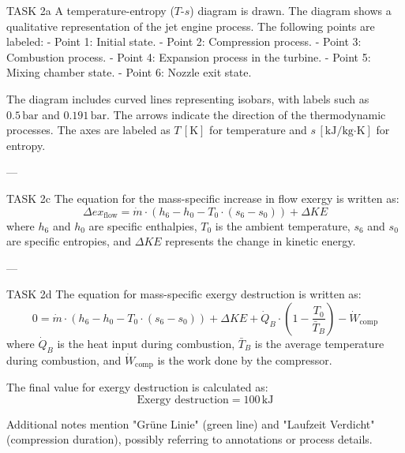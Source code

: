TASK 2a  
A temperature-entropy (\(T\)-\(s\)) diagram is drawn. The diagram shows a qualitative representation of the jet engine process. The following points are labeled:  
- Point 1: Initial state.  
- Point 2: Compression process.  
- Point 3: Combustion process.  
- Point 4: Expansion process in the turbine.  
- Point 5: Mixing chamber state.  
- Point 6: Nozzle exit state.  

The diagram includes curved lines representing isobars, with labels such as \(0.5 \, \text{bar}\) and \(0.191 \, \text{bar}\). The arrows indicate the direction of the thermodynamic processes. The axes are labeled as \(T \, [\text{K}]\) for temperature and \(s \, [\text{kJ/kg·K}]\) for entropy.

---

TASK 2c  
The equation for the mass-specific increase in flow exergy is written as:  
\[
\Delta ex_{\text{flow}} = \dot{m} \cdot (h_6 - h_0 - T_0 \cdot (s_6 - s_0)) + \Delta KE
\]  
where \(h_6\) and \(h_0\) are specific enthalpies, \(T_0\) is the ambient temperature, \(s_6\) and \(s_0\) are specific entropies, and \(\Delta KE\) represents the change in kinetic energy.

---

TASK 2d  
The equation for mass-specific exergy destruction is written as:  
\[
0 = \dot{m} \cdot (h_6 - h_0 - T_0 \cdot (s_6 - s_0)) + \Delta KE + \dot{Q}_B \cdot \left(1 - \frac{T_0}{\bar{T}_B}\right) - \dot{W}_{\text{comp}}
\]  
where \(\dot{Q}_B\) is the heat input during combustion, \(\bar{T}_B\) is the average temperature during combustion, and \(\dot{W}_{\text{comp}}\) is the work done by the compressor.

The final value for exergy destruction is calculated as:  
\[
\text{Exergy destruction} = 100 \, \text{kJ}
\]  

Additional notes mention "Grüne Linie" (green line) and "Laufzeit Verdicht" (compression duration), possibly referring to annotations or process details.